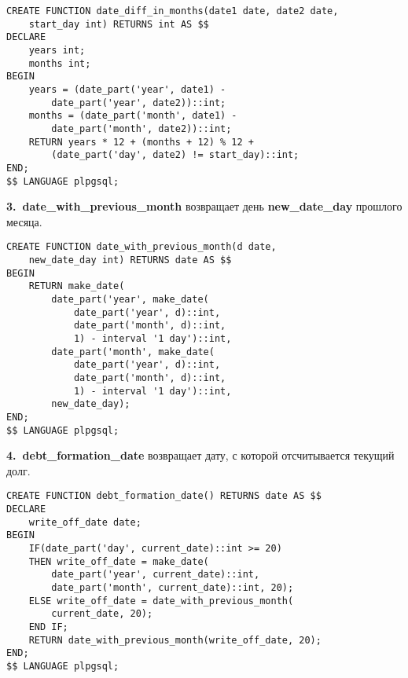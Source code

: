 \documentclass{report}
\begin{document}
\begin{lstlisting}
CREATE FUNCTION date_diff_in_months(date1 date, date2 date,
    start_day int) RETURNS int AS $$
DECLARE
    years int;
    months int;
BEGIN
    years = (date_part('year', date1) - 
        date_part('year', date2))::int;
    months = (date_part('month', date1) - 
        date_part('month', date2))::int;
    RETURN years * 12 + (months + 12) % 12 + 
        (date_part('day', date2) != start_day)::int;
END;
$$ LANGUAGE plpgsql;
\end{lstlisting}

\textbf{3.\ date\_with\_previous\_month} возвращает день \textbf{new\_date\_day} 
прошлого месяца. 

\begin{lstlisting}
CREATE FUNCTION date_with_previous_month(d date,
    new_date_day int) RETURNS date AS $$
BEGIN
    RETURN make_date(
        date_part('year', make_date(
            date_part('year', d)::int, 
            date_part('month', d)::int, 
            1) - interval '1 day')::int,
        date_part('month', make_date(
            date_part('year', d)::int, 
            date_part('month', d)::int, 
            1) - interval '1 day')::int,
        new_date_day);
END;
$$ LANGUAGE plpgsql;
\end{lstlisting}

\textbf{4.\ debt\_formation\_date} возвращает дату, с которой
отсчитывается текущий долг. 

\begin{lstlisting}
CREATE FUNCTION debt_formation_date() RETURNS date AS $$
DECLARE
    write_off_date date;
BEGIN
    IF(date_part('day', current_date)::int >= 20)
    THEN write_off_date = make_date(
        date_part('year', current_date)::int, 
        date_part('month', current_date)::int, 20);
    ELSE write_off_date = date_with_previous_month(
        current_date, 20);
    END IF;
    RETURN date_with_previous_month(write_off_date, 20);
END;
$$ LANGUAGE plpgsql;
\end{lstlisting}
\end{document}
